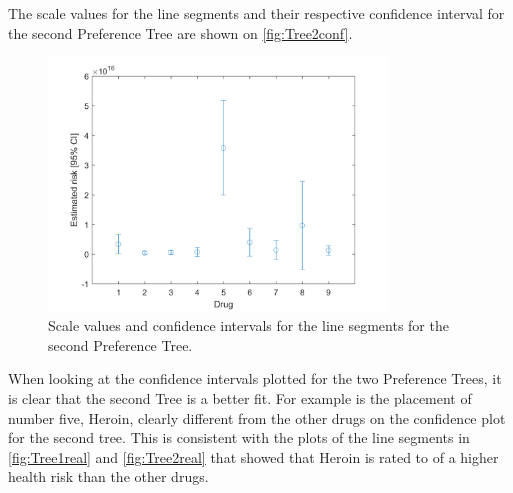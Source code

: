 \noindent
%
The scale values for the line segments and their respective confidence interval for the second Preference Tree are shown on \autoref{fig:Tree2conf}.
%
\begin{figure}[H]
	\centering
	\includegraphics[width = 0.80\textwidth]{Figure/confidense_p1414}
	\caption{Scale values and confidence intervals for the line segments for the second Preference Tree.}
	\label{fig:Tree2conf}
\end{figure}
\noindent
%
When looking at the confidence intervals plotted for the two Preference Trees, it is clear that the second Tree is a better fit. For example is the placement of number five, Heroin, clearly different from the other drugs on the confidence plot for the second tree. This is consistent with the plots of the line segments in \autoref{fig:Tree1real} and \autoref{fig:Tree2real} that showed that Heroin is rated to of a higher health risk than the other drugs. 